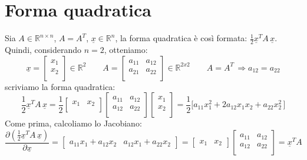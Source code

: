 \section{Forma quadratica}
Sia $A\in\mathbb{R}^{n \times n}$, $A = A^T$, $\underline{x}\in\mathbb{R}^n$, la forma quadratica è così formata: $\frac{1}{2}\underline{x}^TA\,\underline{x}$. Quindi, considerando $n = 2$, otteniamo: 
\begin{equation*}
	\underline{x} = 
	\begin{bmatrix}
		x_1 \\
		x_2 \\
	\end{bmatrix}
	\in\mathbb{R}^2 \qquad
	A = 
	\begin{bmatrix}
		a_{11} & a_{12} \\
		a_{21} & a_{22} \\
	\end{bmatrix}
	\in\mathbb{R}^{2x2} \qquad
	A = A^T \, \Rightarrow a_{12} = a_{22}
\end{equation*}
scriviamo la forma quadratica:
\begin{equation*}
	\frac{1}{2}\underline{x}^TA\,\underline{x} = \frac{1}{2}
	\begin{bmatrix}
		x_1 & x_2 \\
	\end{bmatrix}
	\begin{bmatrix}
		a_{11} & a_{12} \\
		a_{12} & a_{22} \\
	\end{bmatrix}
	\begin{bmatrix}
		x_1 \\
		x_2 \\
	\end{bmatrix}
	= \frac{1}{2} \bigl[a_{11}x_{1}^{2} + 2a_{12}x_1x_2 + a_{22}x_{2}^2\, \bigr]
\end{equation*}
Come prima, calcoliamo lo Jacobiano:
\begin{equation*}
	\frac{\partial (\frac{1}{2}\underline{x}^TA\,\underline{x})}{\partial \underline{x}} = 
	\begin{bmatrix}
		a_{11}x_1 + a_{12}x_2 & a_{12}x_1 + a_{22}x_2
	\end{bmatrix}
	=
	\begin{bmatrix}
		x_1 & x_2
	\end{bmatrix}
	\begin{bmatrix}
		a_{11} & a_{12} \\
		a_{12} & a_{22} \\
	\end{bmatrix}
	= \underline{x}^TA
\end{equation*}

